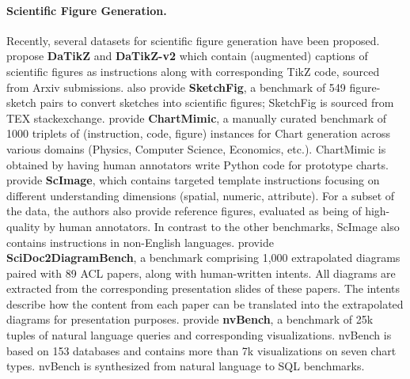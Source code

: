 \paragraph{Scientific Figure Generation.} Recently, several datasets for scientific figure generation have been proposed. %
\citet{belouadi2024automatikz,belouadi2024detikzify} propose \textbf{DaTikZ} and \textbf{DaTikZ-v2} which contain (augmented) captions of scientific figures as instructions along with corresponding TikZ code, sourced from Arxiv submissions. %
\citet{belouadi2024detikzify} also provide \textbf{SketchFig}, a benchmark of 549 figure-sketch pairs to convert sketches into scientific figures; SketchFig is sourced from TEX stackexchange.  \citet{shi2024chartmimicevaluatinglmmscrossmodal} provide \textbf{ChartMimic}, a manually curated benchmark of 1000 triplets of %
(instruction, code, figure)  
instances for Chart generation across various domains (Physics, Computer Science, Economics, etc.). %
ChartMimic is obtained by having human annotators write Python code for prototype charts.  \citet{zhang2024scimagegoodmultimodallarge} provide \textbf{ScImage}, which contains targeted template instructions focusing on different understanding dimensions (spatial, numeric, attribute). %
For a subset of the data, the authors also provide reference figures, %
evaluated as being of high-quality by human annotators. In contrast to the other %
benchmarks, ScImage also contains instructions in non-English languages. \citet{mondal-etal-2024-scidoc2diagrammer} provide \textbf{SciDoc2DiagramBench}, %
a benchmark comprising 1,000 extrapolated diagrams paired with 89 ACL papers, along with human-written intents. All diagrams are extracted from the corresponding presentation slides of these papers. %
The intents describe how the content from each paper can be translated into the extrapolated diagrams for presentation purposes. %
\citet{Luo2021nvBenchAL} provide \textbf{nvBench}, a benchmark of 25k tuples of natural language queries and corresponding visualizations. nvBench is based on 153 databases and contains more than 7k visualizations on seven chart types. nvBench is synthesized from natural language to SQL benchmarks. 

